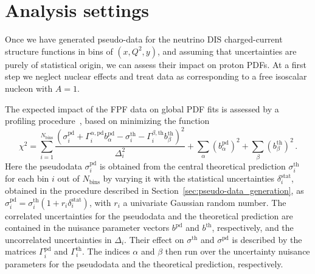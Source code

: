 \clearpage
\section{Analysis settings}
\label{sec:settings}

Once we have generated pseudo-data for the 
neutrino DIS charged-current structure functions
in bins of $(x,Q^2,y)$, and assuming that uncertainties
are purely of statistical origin, we can assess their
impact on proton PDFs.
%
At a first step we neglect nuclear effects
and treat data as corresponding to a free isoscalar
nucleon with $A=1$.

The expected impact of the FPF data on global PDF fits is assessed by a profiling procedure~\cite{Paukkunen:2014zia, Schmidt:2018hvu, AbdulKhalek:2018rok, HERAFitterdevelopersTeam:2015cre}, based on minimizing the function
\begin{equation}
\chi^2 = 
\sum_{i=1}^{N_{\textrm{bins}}} 
\frac{\left(  \sigma_i^{\textrm{pd}}
            + \Gamma_i^{\alpha,\textrm{pd}}
              b_\alpha^{\textrm{pd}}
            - \sigma_i^{\textrm{th}}
            - \Gamma_i^{\beta,\textrm{th}}
              b_\beta^{\textrm{th}}
     \right)^2
     }{\Delta_i^2}
+ \sum_\alpha (b_\alpha^{\textrm{pd}})^2
+ \sum_\beta  (b_\beta^{\textrm{th}})^2 \, .
\label{eq:profilingchi2}
\end{equation}
Here the pseudodata 
$\sigma_i^{\textrm{pd}}$ 
is obtained from the central theoretical prediction 
$\sigma_i^{\textrm{th}}$ 
for each bin $i$ out of $N_{\textrm{bins}}$ by varying it with the statistical uncertainties 
$\delta_i^{\textrm{stat}}$, 
obtained in the procedure described in Section~\ref{sec:pseudo-data_generation}, 
as 
$\sigma_i^{\textrm{pd}} = \sigma_i^{\textrm{th}}(1 + r_i \delta_i^{\textrm{stat}})$, 
with $r_i$ a univariate Gaussian random number.
%
The correlated uncertainties for the pseudodata and the theoretical prediction 
are contained in the nuisance parameter vectors $b^{\textrm{pd}}$ and $b^{\textrm{th}}$, respectively, and the uncorrelated uncertainties in $\Delta_i$.
%
Their effect on $\sigma^{\textrm{th}}$ and $\sigma^{\textrm{pd}}$
is described by the matrices $\Gamma_i^{\textrm{pd}}$ and $\Gamma_i^{\textrm{th}}$.
The indices $\alpha$ and $\beta$ then run over the uncertainty nuisance parameters for the pseudodata and the theoretical prediction, respectively.

